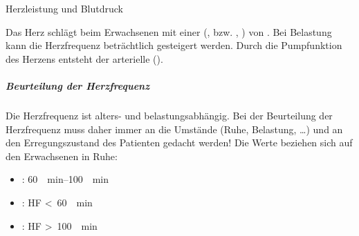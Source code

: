 \TextSlide
{Herzleistung und Blutdruck}
{Das Herz schlägt beim Erwachsenen mit einer
 (, bzw. , ) von
\PerMin*
\cite{Silbernagl3-Herz,Silbernagl3-Kreislaufsystem}. 
Bei Belastung kann die Herzfrequenz beträchtlich
gesteigert werden. Durch die Pumpfunktion des Herzens
entsteht der arterielle
 ().

\subparagraph{{Beurteilung der Herzfrequenz}}
Die Herzfrequenz ist alters- und belastungsabhängig. 
%
Bei der Beurteilung der Herzfrequenz muss daher immer an die Umstände 
(Ruhe, Belastung, \ldots) und an den
Erregungszustand des Patienten gedacht werden!
%
Die Werte beziehen sich auf den Erwachsenen in Ruhe: 
\begin{itemize}
    \item {}: 
    \SIrange[range-phrase = --]{60}{100}{\per\minute} 
    \item {}: 
    HF {\textless}~\SI{60}{\per\minute}
    \item {}: 
    HF {\textgreater}~\SI{100}{\per\minute}
\end{itemize}



}
